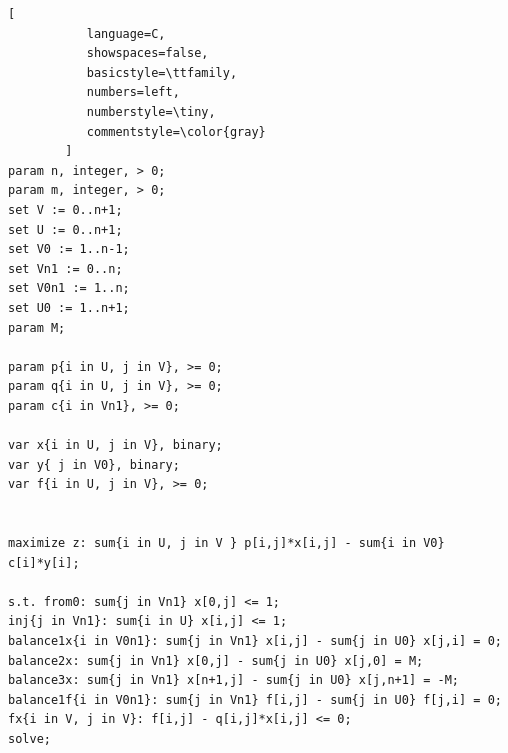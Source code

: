 \documentclass{article}
\begin{document}
\begin{lstlisting}[
           language=C,
           showspaces=false,
           basicstyle=\ttfamily,
           numbers=left,
           numberstyle=\tiny,
           commentstyle=\color{gray}
        ]
param n, integer, > 0;
param m, integer, > 0;
set V := 0..n+1;
set U := 0..n+1;
set V0 := 1..n-1;
set Vn1 := 0..n;
set V0n1 := 1..n;
set U0 := 1..n+1;
param M;

param p{i in U, j in V}, >= 0;
param q{i in U, j in V}, >= 0;
param c{i in Vn1}, >= 0;

var x{i in U, j in V}, binary;
var y{ j in V0}, binary;
var f{i in U, j in V}, >= 0;


maximize z: sum{i in U, j in V } p[i,j]*x[i,j] - sum{i in V0} c[i]*y[i];

s.t. from0: sum{j in Vn1} x[0,j] <= 1;
inj{j in Vn1}: sum{i in U} x[i,j] <= 1;
balance1x{i in V0n1}: sum{j in Vn1} x[i,j] - sum{j in U0} x[j,i] = 0;
balance2x: sum{j in Vn1} x[0,j] - sum{j in U0} x[j,0] = M;
balance3x: sum{j in Vn1} x[n+1,j] - sum{j in U0} x[j,n+1] = -M;
balance1f{i in V0n1}: sum{j in Vn1} f[i,j] - sum{j in U0} f[j,i] = 0;
fx{i in V, j in V}: f[i,j] - q[i,j]*x[i,j] <= 0;
solve;


\end{lstlisting}
\end{document}
